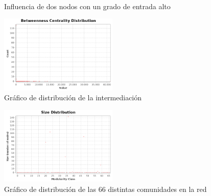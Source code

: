 \documentclass[10pt,a4paper,spanish]{article}
\numberwithin{equation}{section} %
\numberwithin{figure}{section} %
\numberwithin{table}{section} %
\begin{document}
\begin{figure}[!h]
    \centering
    \mbox{
    }
    \caption{Influencia de dos nodos con un grado de entrada alto}
    \label{infllocal}
\end{figure}

\begin{figure}[!h]
    \centering
    \includegraphics[width=0.5\textwidth]{distance-report/Betweenness-Centrality-Distribution}
    \caption{Gráfico de distribución de la intermediación}
    \label{bet}
\end{figure}

\begin{figure}[!h]
    \centering
    \includegraphics[width=0.5\textwidth]{modularity-report/communities-size-distribution}
    \caption{Gráfico de distribución de las 66 distintas comunidades en la red}
    \label{com}
\end{figure}
\end{document}
